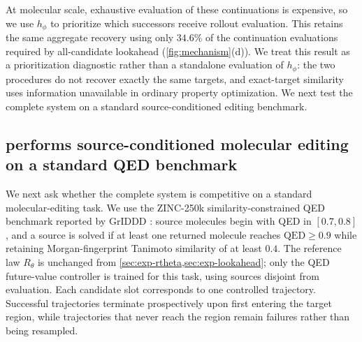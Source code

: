 At molecular scale, exhaustive evaluation of these continuations is expensive, so we use $h_\phi$ to prioritize which successors receive rollout evaluation. This retains the same aggregate recovery using only $34.6\%$ of the continuation evaluations required by all-candidate lookahead (\cref{fig:mechanism}(d)). We treat this result as a prioritization diagnostic rather than a standalone evaluation of $h_\phi$: the two procedures do not recover exactly the same targets, and exact-target similarity uses information unavailable in ordinary property optimization. We next test the complete system on a standard source-conditioned editing benchmark.

\subsection{\method{} performs source-conditioned molecular editing on a standard QED benchmark}
\label{sec:exp-jin}

We next ask whether the complete \method{} system is competitive on a standard molecular-editing task. We use the ZINC-250k similarity-constrained QED benchmark reported by GrIDDD \citep{ninniri2025griddd}: source molecules begin with QED in $[0.7,0.8]$, and a source is solved if at least one returned molecule reaches $\mathrm{QED}\ge0.9$ while retaining Morgan-fingerprint Tanimoto similarity of at least $0.4$. The reference law $R_\theta$ is unchanged from \cref{sec:exp-rtheta,sec:exp-lookahead}; only the QED future-value controller is trained for this task, using sources disjoint from evaluation. Each candidate slot corresponds to one controlled trajectory. Successful trajectories terminate prospectively upon first entering the target region, while trajectories that never reach the region remain failures rather than being resampled.

